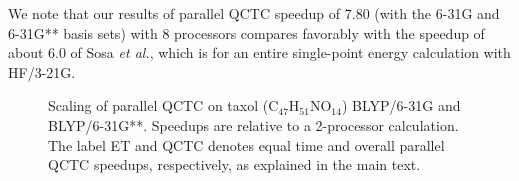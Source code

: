 \commentoutA{\documentclass[prl,aps,twocolumn,twocolumngrid,superbib]{revtex4}}
\begin{document}
We note that our results of parallel QCTC
speedup of 7.80 (with the 6-31G and 6-31G** basis sets) with 8
processors compares favorably with the speedup of about 6.0 of Sosa
{\it et al.}\cite{Sosa_00v26}, which is for an entire single-point
energy calculation with HF/3-21G.

\begin{figure}[t]
\caption{ 
Scaling of parallel QCTC on taxol (C$_{47}$H$_{51}$NO$_{14}$)
BLYP/6-31G and BLYP/6-31G**. Speedups are relative to a 2-processor
calculation.  The label ET and QCTC denotes equal time and overall
parallel QCTC speedups, respectively, as explained in the main text.
}
\label{fig:taxol}
\end{figure}
\end{document}
